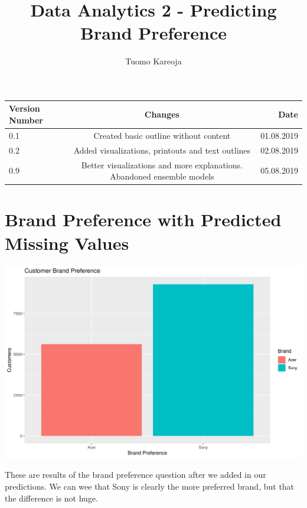 \documentclass[12pt,a4paper,leqno]{report}
\title{Data Analytics 2 - Predicting Brand Preference}
\author{Tuomo Kareoja}
\date{}
\theoremstyle{plain}
\theoremstyle{definition}
\theoremstyle{remark}
\begin{document}
\maketitle

\begin{table}[h!]
  \begin{center}
    \begin{tabular}{l|c|r}
      \textbf{Version Number} & \textbf{Changes} & \textbf{Date} \\
      \hline
      0.1 & Created basic outline without content & 01.08.2019\\
      0.2 & Added visualizations, printouts and text outlines & 02.08.2019\\
      0.9 & Better visualizations and more explanations. Abandoned ensemble models & 05.08.2019\\
    \end{tabular}
  \end{center}
\end{table}

\newpage

\section{Brand Preference with Predicted Missing Values}

\bigskip
{
    \centering
    \includegraphics[width=\textwidth,height=\textheight,keepaspectratio]{brand_preference_plain.png}
    \par
}
\bigskip

These are results of the brand preference question after we added in our predictions. We can wee that Sony
is clearly the more preferred brand, but that the difference is not huge.
\end{document}

